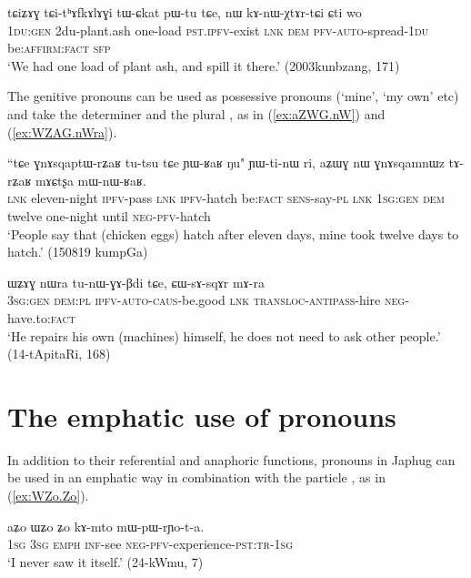 \begin{exe}
\ex \label{ex:tɕithAfkAlAGi}
\gll 
tɕiʑɤɣ tɕi-tʰɤfkɤlɤɣi tɯ-ɕkat pɯ-tu tɕe, nɯ kɤ-nɯ-χtɤr-tɕi ɕti wo \\
\textsc{1du:gen} 2du-plant.ash one-load \textsc{pst.ipfv}-exist \textsc{lnk} \textsc{dem} \textsc{pfv-auto}-spread-\textsc{1du} be:\textsc{affirm}:\textsc{fact} \textsc{sfp} \\
\glt `We had one load of plant ash, and spill it there.' (2003kunbzang, 171)
\end{exe} 

The genitive pronouns can be used as possessive pronouns (`mine', `my own' etc) and take the determiner  and the plural , as in (\ref{ex:aZWG.nW}) and (\ref{ex:WZAG.nWra}).

\begin{exe}
\ex \label{ex:aZWG.nW}
\gll ``tɕe ɣnɤsqaptɯ-rʑaʁ tu-tsu tɕe ɲɯ-ʁaʁ ŋu" ɲɯ-ti-nɯ ri, aʑɯɣ nɯ ɣnɤsqamnɯz tɤ-rʑaʁ mɤɕtʂa mɯ-nɯ-ʁaʁ. \\
\textsc{lnk} eleven-night \textsc{ipfv}-pass \textsc{lnk} \textsc{ipfv}-hatch be:\textsc{fact} \textsc{sens}-say-\textsc{pl} \textsc{lnk} \textsc{1sg:gen} \textsc{dem} twelve one-night  until \textsc{neg-pfv}-hatch \\
\glt `People say that (chicken eggs) hatch after eleven days, mine took twelve days to hatch.' (150819 kumpGa)
\end{exe} 

\begin{exe}
\ex \label{ex:WZAG.nWra}
\gll ɯʑɤɣ nɯra tu-nɯ-ɣɤ-βdi tɕe, ɕɯ-sɤ-sqɤr mɤ-ra \\
\textsc{3sg:gen} \textsc{dem:pl} \textsc{ipfv-auto-caus}-be.good \textsc{lnk} \textsc{transloc-antipass}-hire \textsc{neg}-have.to:\textsc{fact} \\
\glt `He repairs his own (machines) himself, he does not need to ask other people.' (14-tApitaRi, 168)
\end{exe} 

\section{The emphatic use of pronouns} \label{sec:pronouns.emph}
In addition to their referential and anaphoric functions, pronouns in Japhug can be used in an emphatic way in combination with the particle , as in  (\ref{ex:WZo.Zo}).

\begin{exe}
\ex \label{ex:WZo.Zo}
\gll aʑo ɯʑo ʑo kɤ-mto mɯ-pɯ-rɲo-t-a. \\
\textsc{1sg} \textsc{3sg} \textsc{emph} \textsc{inf}-see \textsc{neg-pfv}-experience-\textsc{pst:tr-1sg} \\
\glt `I never saw it itself.' (24-kWmu, 7)
\end{exe} 

